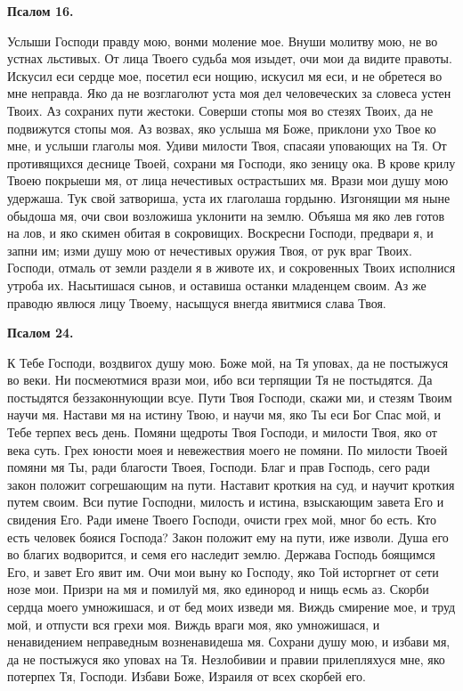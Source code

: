 \bfseries Псалом 16.\normalfont{}\nopagebreak


Услыши Господи правду мою, вонми моление мое. Внуши молитву мою, не во устнах льстивых. От лица Твоего судьба моя изыдет, очи мои да видите правоты. Искусил еси сердце мое, посетил еси нощию, искусил мя еси, и не обретеся во мне неправда. Яко да не возглаголют уста моя дел человеческих за словеса устен Твоих. Аз сохраних пути жестоки. Соверши стопы моя во стезях Твоих, да не подвижутся стопы моя. Аз возвах, яко услыша мя Боже, приклони ухо Твое ко мне, и услыши глаголы моя. Удиви милости Твоя, спасаяи уповающих на Тя. От противящихся деснице Твоей, сохрани мя Господи, яко зеницу ока. В крове крилу Твоею покрыеши мя, от лица нечестивых острастьших мя. Врази мои душу мою удержаша. Тук свой затвориша, уста их глаголаша гордыню. Изгонящии мя ныне обыдоша мя, очи свои возложиша уклонити на землю. Объяша мя яко лев готов на лов, и яко скимен обитая в сокровищих. Воскресни Господи, предвари я, и запни им; изми душу мою от нечестивых оружия Твоя, от рук враг Твоих. Господи, отмаль от земли раздели я в животе их, и сокровенных Твоих исполнися утроба их. Насытишася сынов, и оставиша останки младенцем своим. Аз же праводю явлюся лицу Твоему, насыщуся внегда явитмися слава Твоя.


\medskip


\bfseries Псалом 24.\normalfont{}\nopagebreak


К Тебе Господи, воздвигох душу мою. Боже мой, на Тя уповах, да не постыжуся во веки. Ни посмеютмися врази мои, ибо вси терпящии Тя не постыдятся. Да постыдятся беззаконнующии всуе. Пути Твоя Господи, скажи ми, и стезям Твоим научи мя. Настави мя на истину Твою, и научи мя, яко Ты еси Бог Спас мой, и Тебе терпех весь день. Помяни щедроты Твоя Господи, и милости Твоя, яко от века суть. Грех юности моея и невежествия моего не помяни. По милости Твоей помяни мя Ты, ради благости Твоея, Господи. Благ и прав Господь, сего ради закон положит согрешающим на пути. Наставит кроткия на суд, и научит кроткия путем своим. Вси путие Господни, милость и истина, взыскающим завета Его и свидения Его. Ради имене Твоего Господи, очисти грех мой, мног бо есть. Кто есть человек бояися Господа? Закон положит ему на пути, иже изволи. Душа его во благих водворится, и семя его наследит землю. Держава Господь боящимся Его, и завет Его явит им. Очи мои выну ко Господу, яко Той исторгнет от сети нозе мои. Призри на мя и помилуй мя, яко единород и нищь есмь аз. Скорби сердца моего умножишася, и от бед моих изведи мя. Виждь смирение мое, и труд мой, и отпусти вся грехи моя. Виждь враги моя, яко умножишася, и ненавидением неправедным возненавидеша мя. Сохрани душу мою, и избави мя, да не постыжуся яко уповах на Тя. Незлобивии и правии прилепляхуся мне, яко потерпех Тя, Господи. Избави Боже, Израиля от всех скорбей его. 


